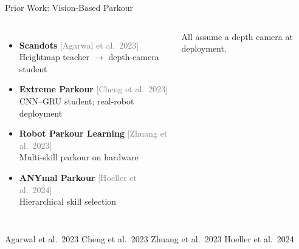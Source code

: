 \documentclass[aspectratio=169,10pt]{beamer}
\newcommand{\source}[1]{\vfill{\tiny\color{gray}#1\par}}
\begin{document}
\begin{frame}{Prior Work: Vision-Based Parkour}
	\begin{columns}[T]
		{\small
			\begin{itemize}
				\setlength\itemsep{0.65em}
				\item \textbf{Scandots} \textcolor{gray}{\scriptsize[Agarwal et al.\ 2023]}\\
				      Heightmap teacher $\to$ depth-camera student
				\item \textbf{Extreme Parkour} \textcolor{gray}{\scriptsize[Cheng et al.\ 2023]}\\
				      CNN--GRU student; real-robot deployment
				\item \textbf{Robot Parkour Learning} \textcolor{gray}{\scriptsize[Zhuang et al.\ 2023]}\\
				      Multi-skill parkour on hardware
				\item \textbf{ANYmal Parkour} \textcolor{gray}{\scriptsize[Hoeller et al.\ 2024]}\\
				      Hierarchical skill selection
			\end{itemize}
		}
		\vspace{0.8em}
		\alert{\small All assume a depth camera at deployment.}
	\end{columns}
	\source{Agarwal et al.\ 2023 \textbar{} Cheng et al.\ 2023 \textbar{} Zhuang et al.\ 2023 \textbar{} Hoeller et al.\ 2024}
\end{frame}
\end{document}
